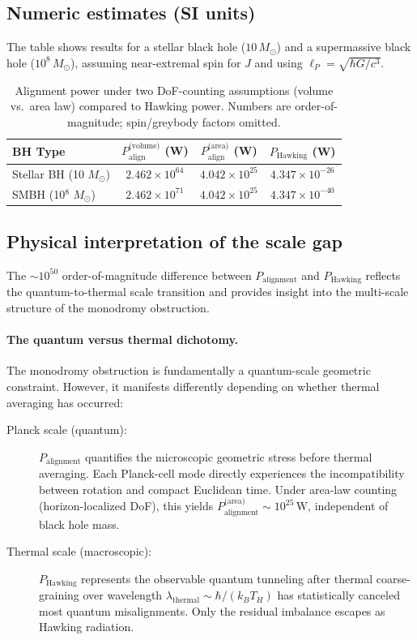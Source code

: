 \documentclass[11pt]{article}
\begin{document}
\subsection*{Numeric estimates (SI units)}
The table shows results for a stellar black hole ($10\,M_\odot$) and a supermassive black hole
($10^8\,M_\odot$), assuming near-extremal spin for $J$ and using
$\ell_P=\sqrt{\hbar G/c^3}$.

\begin{table}[h]
\centering
\begin{tabular}{|l|c|c|c|}
\hline
BH Type & $P_{\text{align}}^{\text{(volume)}}$ (W) & $P_{\text{align}}^{\text{(area)}}$ (W) & $P_{\text{Hawking}}$ (W) \\
\hline
Stellar BH (10 $M_\odot$) & $2.462\times10^{64}$ & $4.042\times10^{25}$ & $4.347\times10^{-26}$ \\
SMBH (10$^8$ $M_\odot$)   & $2.462\times10^{71}$ & $4.042\times10^{25}$ & $4.347\times10^{-40}$ \\
\hline
\end{tabular}
\caption{Alignment power under two DoF-counting assumptions (volume vs.\ area law) compared to Hawking power.
Numbers are order-of-magnitude; spin/greybody factors omitted.}
\end{table}

\subsection*{Physical interpretation of the scale gap}

The $\sim 10^{50}$ order-of-magnitude difference between $P_{\text{alignment}}$ and 
$P_{\text{Hawking}}$ reflects the quantum-to-thermal scale transition and provides 
insight into the multi-scale structure of the monodromy obstruction.

\paragraph{The quantum versus thermal dichotomy.}
The monodromy obstruction is fundamentally a quantum-scale geometric constraint. 
However, it manifests differently depending on whether thermal averaging has occurred:

\begin{description}
  \item[Planck scale (quantum):] $P_{\text{alignment}}$ quantifies the microscopic 
  geometric stress before thermal averaging. Each Planck-cell mode directly experiences 
  the incompatibility between rotation and compact Euclidean time. Under area-law 
  counting (horizon-localized DoF), this yields $P_{\text{alignment}}^{\text{(area)}} 
  \sim 10^{25}\,\text{W}$, independent of black hole mass.
  
  \item[Thermal scale (macroscopic):] $P_{\text{Hawking}}$ represents the observable 
  quantum tunneling after thermal coarse-graining over wavelength 
  $\lambda_{\text{thermal}} \sim \hbar/(k_B T_H)$ has statistically canceled most 
  quantum misalignments. Only the residual imbalance escapes as Hawking radiation.
\end{description}
\end{document}
